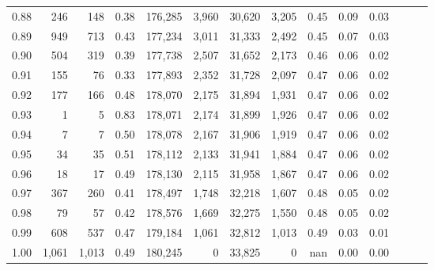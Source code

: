 \begin{tabular}{rrrrrrrrrrrrrr}
0.88 &     246 &    148 &  0.38 &  176,285 &    3,960 &  30,620 &   3,205 &  0.45 &  0.09 &      0.03 \\
0.89 &     949 &    713 &  0.43 &  177,234 &    3,011 &  31,333 &   2,492 &  0.45 &  0.07 &      0.03 \\
0.90 &     504 &    319 &  0.39 &  177,738 &    2,507 &  31,652 &   2,173 &  0.46 &  0.06 &      0.02 \\
0.91 &     155 &     76 &  0.33 &  177,893 &    2,352 &  31,728 &   2,097 &  0.47 &  0.06 &      0.02 \\
0.92 &     177 &    166 &  0.48 &  178,070 &    2,175 &  31,894 &   1,931 &  0.47 &  0.06 &      0.02 \\
0.93 &       1 &      5 &  0.83 &  178,071 &    2,174 &  31,899 &   1,926 &  0.47 &  0.06 &      0.02 \\
0.94 &       7 &      7 &  0.50 &  178,078 &    2,167 &  31,906 &   1,919 &  0.47 &  0.06 &      0.02 \\
0.95 &      34 &     35 &  0.51 &  178,112 &    2,133 &  31,941 &   1,884 &  0.47 &  0.06 &      0.02 \\
0.96 &      18 &     17 &  0.49 &  178,130 &    2,115 &  31,958 &   1,867 &  0.47 &  0.06 &      0.02 \\
0.97 &     367 &    260 &  0.41 &  178,497 &    1,748 &  32,218 &   1,607 &  0.48 &  0.05 &      0.02 \\
0.98 &      79 &     57 &  0.42 &  178,576 &    1,669 &  32,275 &   1,550 &  0.48 &  0.05 &      0.02 \\
0.99 &     608 &    537 &  0.47 &  179,184 &    1,061 &  32,812 &   1,013 &  0.49 &  0.03 &      0.01 \\
1.00 &   1,061 &  1,013 &  0.49 &  180,245 &        0 &  33,825 &       0 &   nan &  0.00 &      0.00 \\
\bottomrule
\end{tabular}
